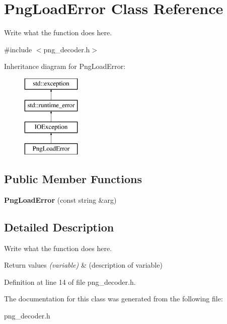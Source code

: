 \hypertarget{classPngLoadError}{\section{Png\+Load\+Error Class Reference}
\label{classPngLoadError}
}


Write what the function does here.  




{\ttfamily \#include $<$png\+\_\+decoder.\+h$>$}

Inheritance diagram for Png\+Load\+Error\+:\begin{figure}[H]
\begin{center}
\leavevmode
\includegraphics[height=4.000000cm]{classPngLoadError}
\end{center}
\end{figure}
\subsection*{Public Member Functions}
\begin{DoxyCompactItemize}
\item 
\hypertarget{classPngLoadError_afa477343655020d65c982aeedb118979}{{\bfseries Png\+Load\+Error} (const string \&arg)}\label{classPngLoadError_afa477343655020d65c982aeedb118979}

\end{DoxyCompactItemize}


\subsection{Detailed Description}
Write what the function does here. 


\begin{DoxyRetVals}{Return values}
{\em (variable)} & (description of variable) \\
\hline
\end{DoxyRetVals}


Definition at line 14 of file png\+\_\+decoder.\+h.



The documentation for this class was generated from the following file\+:\begin{DoxyCompactItemize}
\item 
png\+\_\+decoder.\+h\end{DoxyCompactItemize}

